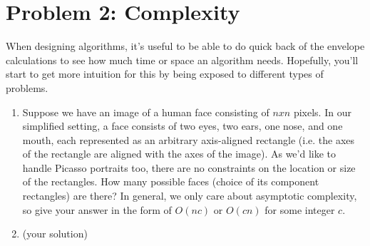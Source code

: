 \documentclass[10pt]{article}
\begin{document}
\section*{\normalsize Problem 2: Complexity}

When designing algorithms, it's useful to be able to do quick back of the envelope calculations to see how much time or space an algorithm needs. Hopefully, you'll start to get more intuition for this by being exposed to different types of problems.

\begin{enumerate}[label=(\alph*)]

  \item Suppose we have an image of a human face consisting of $nxn$ pixels. In our simplified setting, a face consists of two eyes, two ears, one nose, and one mouth, each represented as an arbitrary axis-aligned rectangle (i.e. the axes of the rectangle are aligned with the axes of the image). As we'd like to handle Picasso portraits too, there are no constraints on the location or size of the rectangles. How many possible faces (choice of its component rectangles) are there? In general, we only care about asymptotic complexity, so give your answer in the form of $O(nc)$ or $O(cn)$ for some integer $c$.
  
  \item (your solution)
\end{enumerate}
\end{document}
